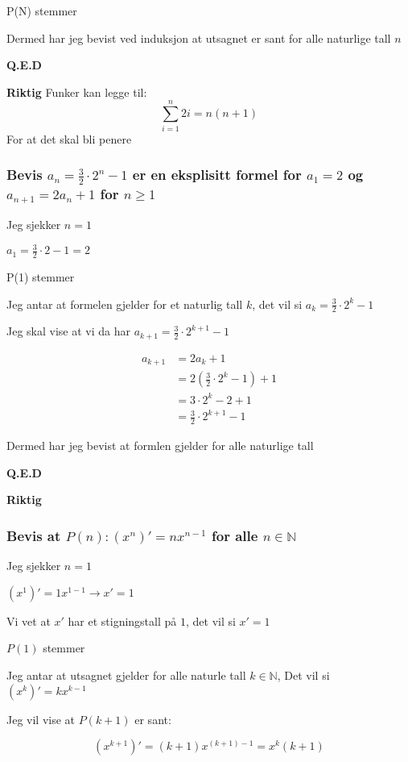 \documentclass{article}
\begin{document}
P(N) stemmer

Dermed har jeg bevist ved induksjon at utsagnet er sant for alle naturlige tall $n$

\textbf{Q.E.D}

\textbf{Riktig}
Funker kan legge til:
\[
\sum_{i=1}^{n} 2i = n(n + 1)
\]
For at det skal bli penere

\subsubsection{Bevis $a_n=\frac{3}{2} \cdot 2^n -1$ er en eksplisitt formel for $a_1=2$ og $a_{n+1}=2a_n+1$ for $n \ge 1$}

Jeg sjekker $n=1$

$a_1=\frac{3}{2} \cdot 2 - 1 = 2$

P(1) stemmer

Jeg antar at formelen gjelder for et naturlig tall $k$, det vil si  $a_k=\frac{3}{2} \cdot 2^k - 1$

Jeg skal vise at vi da har $a_{k+1} = \frac{3}{2} \cdot 2^{k+1} - 1$

\begin{align*}
    a_{k+1} &= 2a_k+1 \\
    &= 2(\frac{3}{2} \cdot 2^{k} - 1) + 1 \\
    &= 3 \cdot 2^k - 2 + 1 \\
    &= \frac{3}{2} \cdot 2^{k+1} - 1
\end{align*}

Dermed har jeg bevist at formlen gjelder for alle naturlige tall

\textbf{Q.E.D}

\textbf{Riktig}

\subsubsection{Bevis at $P(n): (x^n)'= nx^{n-1}$ for alle $n \in \mathbb{N}$}

Jeg sjekker $n=1$

$(x^1)'= 1x^{1-1} \rightarrow x'=1$

Vi vet at $x'$ har et stigningstall på $1$, det vil si $x'= 1$

$P(1)$ stemmer

Jeg antar at utsagnet gjelder for alle naturle tall $k \in \mathbb{N}$, Det vil si $(x^k)' = kx^{k-1}$

Jeg vil vise at $P(k+1)$ er sant:

$$(x^{k+1})' = (k+1)x^{(k+1)-1} = x^k(k+1)$$
\end{document}
